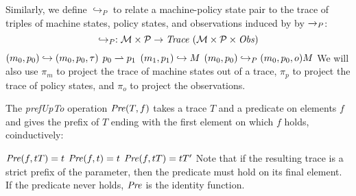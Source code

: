 \documentclass[acmsmall,review,anonymous]{acmart}\settopmatter{printfolios=true,printccs=false,printacmref=false}
\begin{document}

Similarly, we define \(\hookrightarrow_P\) to relate a machine-policy
state pair to the trace of triples of machine states, policy states,
and observations induced by by \(\xrightarrow{}_P\): 
%
\[\hookrightarrow_P : {\mathcal M} \times \mathcal{P} \rightarrow \mathit{Trace}~({\mathcal M} \times \mathcal{P} \times \mathit{Obs}) \]
%
         {\((m_0,p_0) \hookrightarrow (m_0,p_0,\tau)\)}
%
              {\(p_0 \rightharpoonup p_1\)}
              {\((m_1,p_1) \hookrightarrow M\)}
              {\((m_0,p_0) \hookrightarrow_P (m_0,p_0,o) M\)}
We will also use \(\pi_m\) to project the trace of machine states
out of a trace, \(\pi_p\) to project the trace of policy states, and
\(\pi_o\) to project the observations.  

The {\it prefUpTo} operation \(\mathit{Pre}(T,f)\) 
takes a trace \(T\)
and a predicate on elements \(f\) and gives the prefix of \(T\)
ending with the first element on which \(f\) holds, coinductively:

         {\(\mathit{Pre}(f,tT) = t\)}
%
\judgment{}
         {\(\mathit{Pre}(f,t) = t\)}
%
            {\(\mathit{Pre}(f,tT) = tT'\)}
%
Note that if the resulting trace is a strict prefix of the parameter, then the
predicate must hold on its final element. If the predicate never holds,
\(\mathit{Pre}\) is the identity function.

\end{document}
